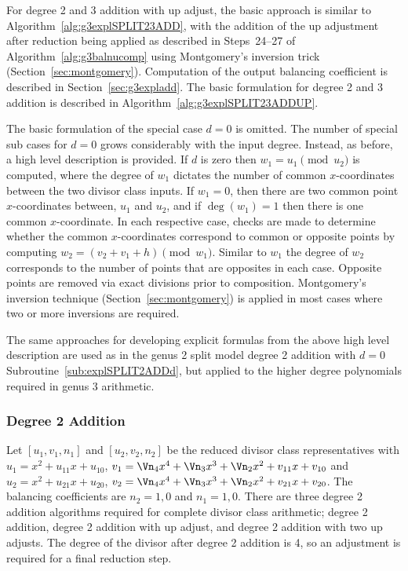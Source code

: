 For degree 2 and 3 addition with up adjust, the basic approach is similar to
Algorithm~\ref{alg:g3explSPLIT23ADD}, with the addition of the up adjustment
after reduction being applied as described in Steps~24--27 of
Algorithm~\ref{alg:g3balnucomp} using Montgomery's inversion trick
(Section~\ref{sec:montgomery}).  Computation of the output balancing coefficient
is described in Section~\ref{sec:g3expladd}. The basic formulation for degree 2
and 3 addition is described in Algorithm~\ref{alg:g3explSPLIT23ADDUP}.

The basic formulation of the special case $d = 0$ is omitted. The number of
special sub cases for $d=0$ grows considerably with the input degree. Instead,
as before, a high level description is provided. If $d$ is zero then $w_1 = u_1
\pmod {u_2}$ is computed, where the degree of $w_1$ dictates the number of
common $x$-coordinates between the two divisor class inputs. If $w_1=0$, then
there are two common point $x$-coordinates between, $u_1$ and $u_2$, and if
$\deg(w_1) = 1$ then there is one common $x$-coordinate. In each respective
case, checks are made to determine whether the common $x$-coordinates correspond
to common or opposite points by computing $w_2 = (v_2 + v_1 + h) \pmod{w_1}$.
Similar to $w_1$ the degree of $w_2$ corresponds to the number of points that
are opposites in each case. Opposite points are removed via exact divisions
prior to composition. Montgomery's inversion technique
(Section~\ref{sec:montgomery}) is applied in most cases where two or more
inversions are required. 

The same approaches for developing explicit formulas from the above high level
description are used as in the genus 2 split model degree 2 addition with $d=0$
Subroutine~\ref{sub:explSPLIT2ADDd}, but applied to the higher degree
polynomials required in genus 3 arithmetic.


\subsubsection{Degree 2 Addition}
Let $[u_1,v_1,n_1]$ and $[u_2,v_2,n_2]$ be the reduced divisor class representatives
with $u_1 = x^2 + u_{11}x + u_{10}$, $v_1 = \Vn_4x^4 + \Vn_3x^3 + \Vn_2x^2
+ v_{11}x + v_{10}$ and $u_2 = x^2 + u_{21}x + u_{20}$, $v_2 = \Vn_4x^4 +
\Vn_3x^3 + \Vn_2x^2 + v_{21}x + v_{20}$. The balancing coefficients are $n_2 = 1,0$ and
$n_1 = 1,0$. There are three degree 2 addition algorithms required for complete
divisor class arithmetic; degree 2 addition, degree 2 addition with up adjust,
and degree 2 addition with two up adjusts.  The degree of the divisor after
degree 2 addition is 4, so an adjustment is required for a final reduction step.

